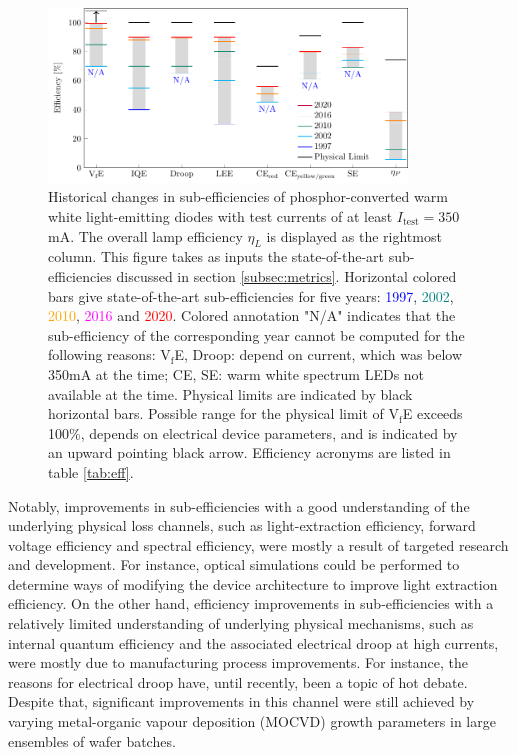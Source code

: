 \documentclass[a4paper,nocompress]{spie}  %
\begin{document}
    \begin{figure} [ht]
        \begin{center}
            \includegraphics[width=0.85\textwidth]{SPIE/article/breakthroughs_efficiency.pdf}
        \end{center}
        \caption{Historical changes in sub-efficiencies of phosphor-converted warm white light-emitting diodes with test currents of at least $I_\text{test}=350$mA. The overall lamp efficiency $\eta_L$ is displayed as the rightmost column. This figure takes as inputs the state-of-the-art sub-efficiencies discussed in section \ref{subsec:metrics}. Horizontal colored bars give state-of-the-art sub-efficiencies for five years: \textcolor{blue}{1997}, \textcolor{teal}{2002}, \textcolor{orange}{2010}, \textcolor{magenta}{2016} and \textcolor{red}{2020}. Colored annotation "N/A" indicates that the sub-efficiency of the corresponding year cannot be computed for the following reasons: V$_\text{f}$E, Droop: depend on current, which was below 350mA at the time; CE, SE: warm white spectrum LEDs not available at the time. Physical limits are indicated by black horizontal bars. Possible range for the physical limit of V$_\text{f}$E exceeds 100\%, depends on electrical device parameters, and is indicated by an upward pointing black arrow. Efficiency acronyms are listed in table \ref{tab:eff}.}
        \label{fig:efficiency}
    \end{figure}
    
    Notably, improvements in sub-efficiencies with a good understanding of the underlying physical loss channels, such as light-extraction efficiency, forward voltage efficiency and spectral efficiency, were mostly a result of targeted research and development. For instance, optical simulations could be performed to determine ways of modifying the device architecture to improve light extraction efficiency. On the other hand, efficiency improvements in sub-efficiencies with a relatively limited understanding of underlying physical mechanisms, such as internal quantum efficiency and the associated electrical droop at high currents, were mostly due to manufacturing process improvements. For instance, the reasons for electrical droop have, until recently, been a topic of hot debate. Despite that, significant improvements in this channel were still achieved by varying metal-organic vapour deposition (MOCVD) growth parameters in large ensembles of wafer batches.
\end{document}
